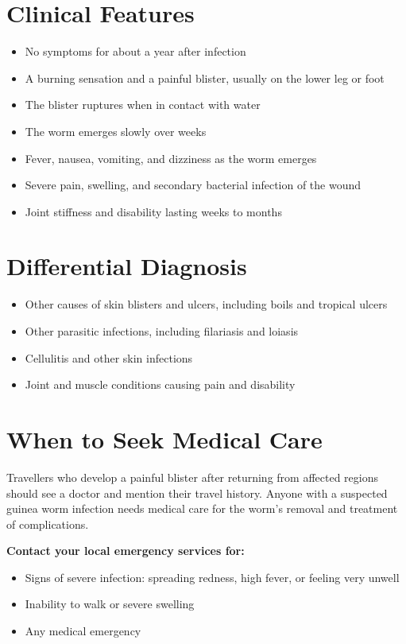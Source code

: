 \section*{Clinical Features}
\begin{itemize}
    \item No symptoms for about a year after infection
    \item A burning sensation and a painful blister, usually on the lower leg or foot
    \item The blister ruptures when in contact with water
    \item The worm emerges slowly over weeks
    \item Fever, nausea, vomiting, and dizziness as the worm emerges
    \item Severe pain, swelling, and secondary bacterial infection of the wound
    \item Joint stiffness and disability lasting weeks to months
\end{itemize}

\section*{Differential Diagnosis}
\begin{itemize}
    \item Other causes of skin blisters and ulcers, including boils and tropical ulcers
    \item Other parasitic infections, including filariasis and loiasis
    \item Cellulitis and other skin infections
    \item Joint and muscle conditions causing pain and disability
\end{itemize}

\section*{When to Seek Medical Care}
Travellers who develop a painful blister after returning from affected regions should see a doctor and mention their travel history. Anyone with a suspected guinea worm infection needs medical care for the worm's removal and treatment of complications.

\textbf{Contact your local emergency services for:}
\begin{itemize}
    \item Signs of severe infection: spreading redness, high fever, or feeling very unwell
    \item Inability to walk or severe swelling
    \item Any medical emergency
\end{itemize}

